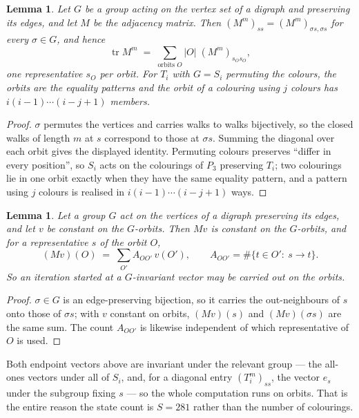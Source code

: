 \documentclass[11pt,a4paper]{article}
\theoremstyle{plain}
\newtheorem{lemma}[theorem]{Lemma}
\theoremstyle{definition}
\begin{document}
\begin{lemma}\label{lem:trace}
Let $G$ be a group acting on the vertex set of a digraph and preserving its edges, and let $M$
be the adjacency matrix. Then $(M^m)_{ss}=(M^m)_{\sigma s,\sigma s}$ for every
$\sigma\in G$, and hence
\[
\operatorname{tr} M^m\;=\;\sum_{\text{orbits }O}|O|\;(M^m)_{s_O s_O} ,
\]
one representative $s_O$ per orbit. For $T_i$ with $G=S_i$ permuting the colours, the orbits
are the equality patterns and the orbit of a colouring using $j$ colours has
$i(i-1)\cdots(i-j+1)$ members.
\end{lemma}

\begin{proof}
$\sigma$ permutes the vertices and carries walks to walks bijectively, so the closed walks of
length $m$ at $s$ correspond to those at $\sigma s$. Summing the diagonal over each orbit
gives the displayed identity. Permuting colours preserves ``differ in every position'', so
$S_i$ acts on the colourings of $P_{3}$ preserving $T_i$; two colourings lie in one orbit
exactly when they have the same equality pattern, and a pattern using $j$ colours is realised
in $i(i-1)\cdots(i-j+1)$ ways.
\end{proof}

\begin{lemma}\label{lem:lump}
Let a group $G$ act on the vertices of a digraph preserving its edges, and let $v$ be constant
on the $G$-orbits. Then $Mv$ is constant on the $G$-orbits, and for a representative $s$ of
the orbit $O$,
\[
(Mv)(O)\;=\;\sum_{O'}A_{OO'}\,v(O'),\qquad
A_{OO'}=\#\{t\in O':\ s\to t\} .
\]
So an iteration started at a $G$-invariant vector may be carried out on the orbits.
\end{lemma}

\begin{proof}
$\sigma\in G$ is an edge-preserving bijection, so it carries the out-neighbours of $s$ onto
those of $\sigma s$; with $v$ constant on orbits, $(Mv)(s)$ and $(Mv)(\sigma s)$ are the same
sum. The count $A_{OO'}$ is likewise independent of which representative of $O$ is used.
\end{proof}

Both endpoint vectors above are invariant under the relevant group --- the all-ones vectors
under all of $S_i$, and, for a diagonal entry $(T_i^m)_{ss}$, the vector $e_s$ under the
subgroup fixing $s$ --- so the whole computation runs on orbits. That is the entire reason the
state count is $S=281$ rather than the number of colourings.
\end{document}
